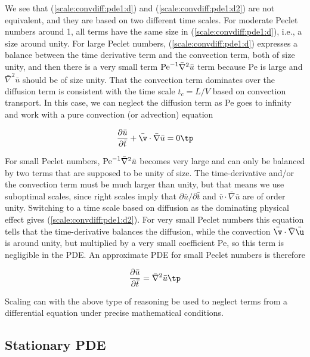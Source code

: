 \documentclass[graybox,envcountchap,sectrefs,final]{svmonodo}
\newenvironment{notice_mdfboxadmon}[1][]{
\begin{notice_mdfboxmdframed}[frametitle=#1]
}
{
\end{notice_mdfboxmdframed}
}
\begin{document}
\begin{notice_mdfboxadmon}
We see that (\ref{scale:convdiff:pde1:d}) and (\ref{scale:convdiff:pde1:d2})
are not equivalent, and they are based on two different time scales.
For moderate Peclet numbers around 1, all terms have the same size
in (\ref{scale:convdiff:pde1:d}), i.e., a size around unity.
For large Peclet numbers,
(\ref{scale:convdiff:pde1:d}) expresses a balance
between the time derivative term and the convection term, both of size
unity, and then there is a very small term
$\hbox{Pe}^{-1}\bar\nabla^2\bar u$ term because Pe is large and
$\bar\nabla^2\bar u$ should be of size unity.
That the convection term dominates over the diffusion term is
consistent with the time scale $t_c=L/V$ based on convection transport.
In this case, we can neglect the diffusion term as Pe goes to infinity
and work with a pure convection (or advection) equation

\[
\frac{\partial \bar u}{\partial \bar t} +
\bar\v\cdot\bar\nabla\bar u = 0\tp
\]

For small Peclet numbers, $\hbox{Pe}^{-1}\bar\nabla^2\bar u$ becomes
very large and can only be balanced by two terms that are supposed to
be unity of size.  The time-derivative and/or the convection term must
be much larger than unity, but that means we use suboptimal scales,
since right scales imply that $\partial\bar u/\partial\bar t$ and
$\bar v\cdot\bar\nabla\bar u$ are of order unity. Switching to a time
scale based on diffusion as the dominating physical effect gives
(\ref{scale:convdiff:pde1:d2}).  For very small Peclet numbers this
equation tells that the time-derivative balances the diffusion, while
the convection $\bar\v\cdot\bar\nabla\bar\u$ is around
unity, but multiplied by a very small coefficient Pe, so this term is
negligible in the PDE. An approximate PDE for small Peclet numbers is
therefore

\[
\frac{\partial \bar u}{\partial \bar t}
= \bar\nabla^2\bar u\tp
\]

Scaling can with the above type of reasoning be used
to neglect terms from a differential equation under precise mathematical
conditions.
\end{notice_mdfboxadmon}



\subsection{Stationary PDE}
\end{document}
